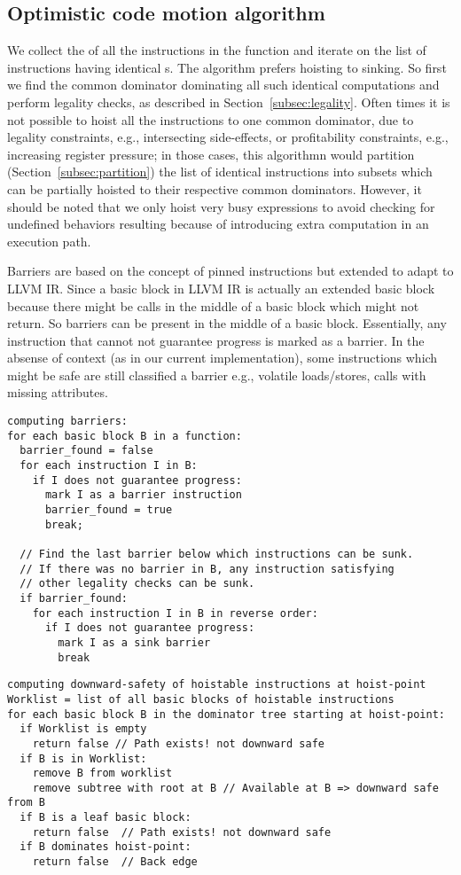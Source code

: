 \documentclass[acmlarge,review]{acmart}\settopmatter{printfolios=true}
\begin{document}
\subsection{Optimistic code motion algorithm}
\label{subsec:optimistic}
We collect the \GVN{} of all the instructions in the function and iterate on the
list of instructions having identical \GVN{}s. The algorithm prefers hoisting to
sinking. So first we find the common dominator dominating all such identical
computations and perform legality checks, as described in
Section~\ref{subsec:legality}. Often times it is not possible to hoist all the
instructions to one common dominator, due to legality constraints, e.g.,
intersecting side-effects, or profitability constraints, e.g., increasing
register pressure; in those cases, this algorithmn would partition
(Section~\ref{subsec:partition}) the list of identical instructions into subsets
which can be partially hoisted to their respective common dominators. However,
it should be noted that we only hoist very busy expressions to avoid checking
for undefined behaviors resulting because of introducing extra computation in an
execution path.

Barriers are based on the concept of pinned instructions \cite{click1995global}
but extended to adapt to LLVM IR. Since a basic block in LLVM IR is actually an
extended basic block because there might be calls in the middle of a basic block
which might not return. So barriers can be present in the middle of a basic
block. Essentially, any instruction that cannot not guarantee progress is marked
as a barrier. In the absense of context (as in our current implementation), some
instructions which might be safe are still classified a barrier e.g., volatile
loads/stores, calls with missing attributes.

\begin{verbatim}
computing barriers:
for each basic block B in a function:
  barrier_found = false
  for each instruction I in B:
    if I does not guarantee progress:
      mark I as a barrier instruction
      barrier_found = true
      break;

  // Find the last barrier below which instructions can be sunk.
  // If there was no barrier in B, any instruction satisfying
  // other legality checks can be sunk.
  if barrier_found:
    for each instruction I in B in reverse order:
      if I does not guarantee progress:
        mark I as a sink barrier
        break
\end{verbatim}

\begin{verbatim}
computing downward-safety of hoistable instructions at hoist-point
Worklist = list of all basic blocks of hoistable instructions
for each basic block B in the dominator tree starting at hoist-point:
  if Worklist is empty
    return false // Path exists! not downward safe
  if B is in Worklist:
    remove B from worklist
    remove subtree with root at B // Available at B => downward safe from B
  if B is a leaf basic block:
    return false  // Path exists! not downward safe
  if B dominates hoist-point:
    return false  // Back edge

\end{verbatim}
\end{document}
